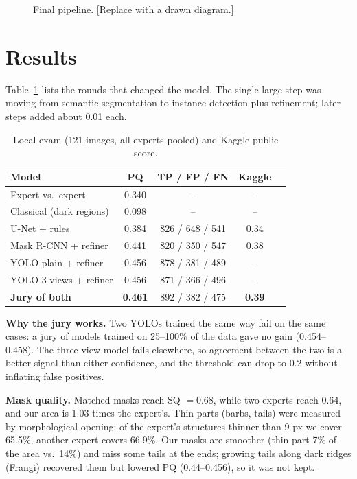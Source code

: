 \documentclass[conference]{IEEEtran}
\begin{document}
\begin{figure}[t]
\centering
{}
\caption{Final pipeline. [Replace with a drawn diagram.]}
\label{fig:pipeline}
\end{figure}

\section{Results}
Table~\ref{tab:rounds} lists the rounds that changed the model. The single large step was moving from
semantic segmentation to instance detection plus refinement; later steps added about 0.01 each.

\begin{table}[t]
\caption{Local exam (121 images, all experts pooled) and Kaggle public score.}
\label{tab:rounds}
\centering\small
\begin{tabular}{@{}lcccc@{}}
\toprule
Model & PQ & TP / FP / FN & Kaggle \\
\midrule
Expert vs.\ expert & 0.340 & -- & -- \\
Classical (dark regions) & 0.098 & -- & -- \\
U-Net + rules & 0.384 & 826 / 648 / 541 & 0.34 \\
Mask R-CNN + refiner & 0.441 & 820 / 350 / 547 & 0.38 \\
YOLO plain + refiner & 0.456 & 878 / 381 / 489 & -- \\
YOLO 3 views + refiner & 0.456 & 871 / 366 / 496 & -- \\
\textbf{Jury of both} & \textbf{0.461} & 892 / 382 / 475 & \textbf{0.39} \\
\bottomrule
\end{tabular}
\end{table}

\textbf{Why the jury works.} Two YOLOs trained the same way fail on the same cases: a jury of models trained
on 25--100\% of the data gave no gain (0.454--0.458). The three-view model fails elsewhere, so agreement
between the two is a better signal than either confidence, and the threshold can drop to 0.2 without
inflating false positives.

\textbf{Mask quality.} Matched masks reach SQ $=0.68$, while two experts reach 0.64, and our area is 1.03
times the expert's. Thin parts (barbs, tails) were measured by morphological opening: of the expert's
structures thinner than 9 px we cover 65.5\%, another expert covers 66.9\%. Our masks are smoother (thin part
7\% of the area vs.\ 14\%) and miss some tails at the ends; growing tails along dark ridges (Frangi)
recovered them but lowered PQ (0.44--0.456), so it was not kept.
\end{document}
